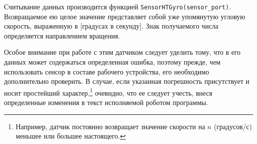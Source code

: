Считывание данных производится функцией \verb|SensorHTGyro(sensor_port)|.
Возвращаемое ею целое значение представляет собой уже упомянутую угловую скорость, выраженную в [градусах в секунду].   
Знак получаемого числа определяется направлением вращения.

Особое внимание при работе с этим датчиком следует уделить тому, что в его данных может содержаться определенная ошибка, поэтому прежде, чем использовать сенсор в составе рабочего устройства, его необходимо дополнительно проверить. 
В случае, если указанная погрешность присутствует и носит простейший характер\lefteqn,\footnote{Например, датчик постоянно возвращает значение скорости на $n$ (градусов/с) меньшее или большее настоящего.} очевидно, что ее следует учесть, внеся определенные изменения в текст исполняемой роботом программы.